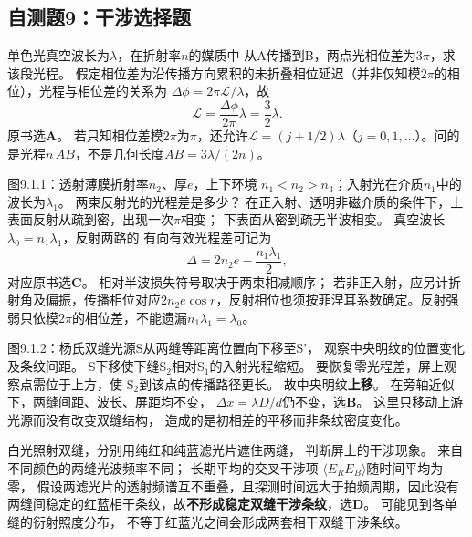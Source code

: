
\subsection{自测题9：干涉选择题}

\problemtext 单色光真空波长为$\lambda$，在折射率$n$的媒质中
从A传播到B，两点光相位差为$3\pi$，求该段光程。
\workings
假定相位差为沿传播方向累积的未折叠相位延迟（并非仅知模$2\pi$的相位），光程与相位差的关系为
$\Delta\phi=2\pi\mathcal L/\lambda$，故
\[
\boxed{\mathcal L=\frac{\Delta\phi}{2\pi}\lambda=\frac32\lambda}.
\]
原书选\textbf{A}。
\crosscheck 若只知相位差模$2\pi$为$\pi$，还允许$\mathcal L=(j+1/2)\lambda$（$j=0,1,\ldots$）。问的是光程$n\,AB$，不是几何长度$AB=3\lambda/(2n)$。

\problemtext 图9.1.1：透射薄膜折射率$n_2$、厚$e$，上下环境
$n_1<n_2>n_3$；入射光在介质$n_1$中的波长为$\lambda_1$。
两束反射光的光程差是多少？
\workings
在正入射、透明非磁介质的条件下，上表面反射从疏到密，出现一次$\pi$相变；
下表面从密到疏无半波相变。
真空波长$\lambda_0=n_1\lambda_1$，反射两路的
有向有效光程差可记为
\[
\boxed{\Delta=2n_2e-\frac{n_1\lambda_1}{2}},
\]
对应原书选\textbf{C}。
\crosscheck 相对半波损失符号取决于两束相减顺序；
若非正入射，应另计折射角及偏振，传播相位对应$2n_2e\cos r$，反射相位也须按菲涅耳系数确定。反射强弱只依模$2\pi$的相位差，不能遗漏$n_1\lambda_1=\lambda_0$。

\problemtext 图9.1.2：杨氏双缝光源S从两缝等距离位置向下移至S'，
观察中央明纹的位置变化及条纹间距。
\workings
S下移使下缝S$_2$相对S$_1$的入射光程缩短。
要恢复零光程差，屏上观察点需位于上方，使
S$_2$到该点的传播路径更长。
故中央明纹\textbf{上移}。
在旁轴近似下，两缝间距、波长、屏距均不变，
$\Delta x=\lambda D/d$仍不变，选\textbf{B}。
\crosscheck 这里只移动上游光源而没有改变双缝结构，
造成的是初相差的平移而非条纹密度变化。

\problemtext 白光照射双缝，分别用纯红和纯蓝滤光片遮住两缝，
判断屏上的干涉现象。
\workings
来自不同颜色的两缝光波频率不同；
长期平均的交叉干涉项
$\langle E_R E_B\rangle$随时间平均为零，
假设两滤光片的透射频谱互不重叠，且探测时间远大于拍频周期，因此没有两缝间稳定的红蓝相干条纹，故\textbf{不形成稳定双缝干涉条纹}，选\textbf{D}。
\crosscheck 可能见到各单缝的衍射照度分布，
不等于红蓝光之间会形成两套相干双缝干涉条纹。

